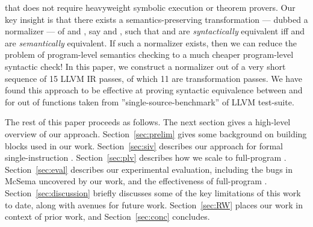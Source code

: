 \begin{enumerate}
  that does not require heavyweight symbolic execution or theorem provers.  Our key 
  insight is that there exists a semantics-preserving transformation --- dubbed a  
  normalizer --- of \T and \TP, say  and , such 
  that
   and  are \emph{syntactically} equivalent iff  
  and  are \emph{semantically} equivalent.  If such a normalizer
  exists, then we can reduce the problem of program-level semantics checking to
  a much cheaper program-level syntactic check!  In this paper, we construct a 
  normalizer out of a very short sequence of 15 LLVM IR passes, of which 11 are
  transformation passes.  We have found this approach to be effective at proving
  syntactic equivalence between  and \Tp for \plvP out of \plvT functions
  taken from  ''single-source-benchmark'' of LLVM test-suite.
\end{enumerate}

%
The rest of this paper proceeds as follows.
%
The next section gives a high-level overview of our approach.
%
Section~\ref{sec:prelim} gives some background on building blocks used in our work.
%
Section~\ref{sec:siv} describes our approach for formal single-instruction \TV.
%
Section~\ref{sec:plv} describes how we scale to full-program \TV.
%
Section~\ref{sec:eval} describes our experimental evaluation, including the bugs 
in McSema uncovered by our work, and the effectiveness of full-program \TV.
%
Section~\ref{sec:discussion} briefly discusses some of the key limitations of this work
to date, along with avenues for future work.
%
Section~\ref{sec:RW} places our work in context of prior work, and
Section~\ref{sec:conc} concludes.




